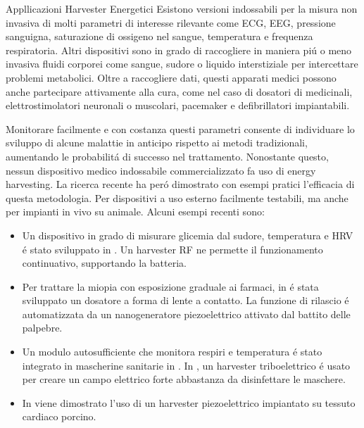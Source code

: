 \begin{section}{Appllicazioni Harvester Energetici}
    Esistono versioni indossabili per la misura non invasiva di molti parametri di interesse rilevante come ECG, EEG, pressione sanguigna, saturazione di ossigeno nel sangue, temperatura e frequenza respiratoria. Altri dispositivi sono in grado di raccogliere in maniera pi\'u o meno invasiva fluidi corporei come sangue, sudore o liquido interstiziale per intercettare problemi metabolici. Oltre a raccogliere dati, questi apparati medici possono anche partecipare attivamente alla cura, come nel caso di dosatori di medicinali, elettrostimolatori neuronali o muscolari, pacemaker e defibrillatori impiantabili.
    
    Monitorare facilmente e con costanza questi parametri consente di individuare lo sviluppo di alcune malattie in anticipo rispetto ai metodi tradizionali, aumentando le probabilit\'a di successo nel trattamento. Nonostante questo, nessun dispositivo medico indossabile commercializzato fa uso di energy harvesting. La ricerca recente ha per\'o dimostrato con esempi pratici l'efficacia di questa metodologia. Per dispositivi a uso esterno facilmente testabili, ma anche per impianti in vivo su animale. Alcuni esempi recenti sono: \begin{itemize}
        \item Un dispositivo in grado di misurare glicemia dal sudore, temperatura e HRV \'e stato sviluppato in \cite{mirlouContinuousGlycemicMonitoring2024}. Un harvester RF ne permette il funzionamento continuativo, supportando la batteria.
        \item Per trattare la miopia con esposizione graduale ai farmaci, in \cite{jiangSelfgeneratedElectricitydrivenDrug2024} \'e stata sviluppato un dosatore a forma di lente a contatto. La funzione di rilascio \'e automatizzata da un nanogeneratore piezoelettrico attivato dal battito delle palpebre.
        \item Un modulo autosufficiente che monitora respiri e temperatura \'e stato integrato in mascherine sanitarie in \cite{lanHighefficientIntelligentAntibacterial2024}. In \cite{simInstantDisinfectingFace}, un harvester triboelettrico \'e usato per creare un campo elettrico forte abbastanza da disinfettare le maschere.
        \item In \cite{anVivoFlexibleEnergy2024} viene dimostrato l'uso di un harvester piezoelettrico impiantato su tessuto cardiaco porcino.
    \end{itemize}
 

\end{section}
